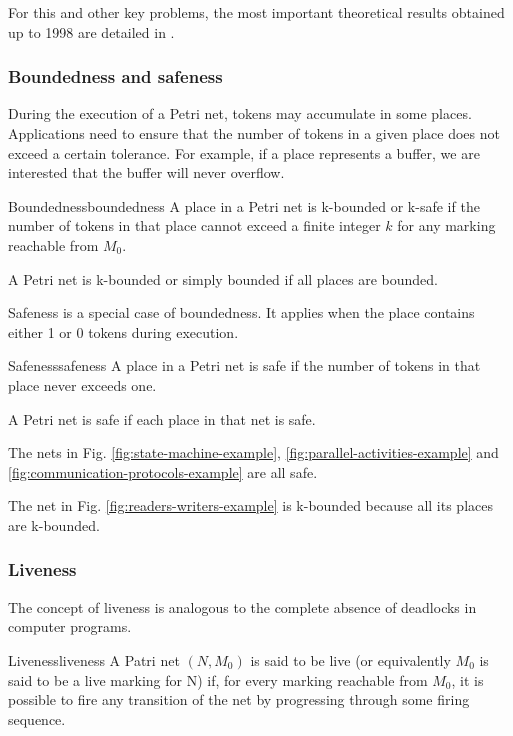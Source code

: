 For this and other key problems, the most important theoretical results
obtained up to 1998 are detailed in \cite{esparza1994decidability}.

\subsubsection{Boundedness and safeness}

During the execution of a Petri net, tokens may accumulate in some places.
Applications need to ensure that the number of tokens in a given place does not
exceed a certain tolerance.
For example, if a place represents a buffer,
we are interested that the buffer will never overflow.

\begin{definition}{Boundedness}{boundedness}
      A place in a Petri net is k-bounded or k-safe
      if the number of tokens in that place cannot exceed a finite integer $k$
      for any marking reachable from $M_0$.

      A Petri net is k-bounded or simply bounded if all places are bounded.
\end{definition}

Safeness is a special case of boundedness.
It applies when the place contains either 1 or 0 tokens during execution.

\begin{definition}{Safeness}{safeness}
      A place in a Petri net is safe if the number of tokens in that place never exceeds one.

      A Petri net is safe if each place in that net is safe.
\end{definition}

The nets in Fig. \ref{fig:state-machine-example}, \ref{fig:parallel-activities-example}
and \ref{fig:communication-protocols-example} are all safe.

The net in Fig. \ref{fig:readers-writers-example}
is k-bounded because all its places are k-bounded.

\subsubsection{Liveness}

The concept of liveness is analogous to
the complete absence of deadlocks in computer programs.

\begin{definition}{Liveness}{liveness}
      A Patri net $(N, M_0)$ is said to be live
      (or equivalently $M_0$ is said to be a live marking for N) if,
      for every marking reachable from $M_0$, it is possible to fire any transition
      of the net by progressing through some firing sequence.
\end{definition}

